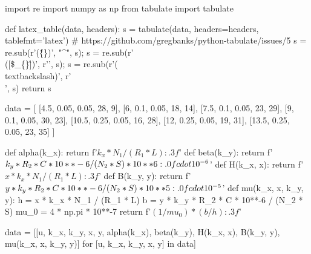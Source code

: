 \documentclass[12pt, a4paper]{article}
\begin{document}
\begin{pycode}
import re
import numpy as np
from tabulate import tabulate

def latex_table(data, headers):
  s = tabulate(data, headers=headers, tablefmt='latex')
  # https://github.com/gregbanks/python-tabulate/issues/5
  s = re.sub(r'(\^\{\})', "^", s); s = re.sub(r'\\([\$\_\{\}\^])', r'\1', s); s = re.sub(r'(\\textbackslash{})', r'\\', s)
  return s

data = [
  [4.5, 0.05, 0.05, 28, 9],
  [6, 0.1, 0.05, 18, 14],
  [7.5, 0.1, 0.05, 23, 29],
  [9, 0.1, 0.05, 30, 23],
  [10.5, 0.25, 0.05, 16, 28],
  [12, 0.25, 0.05, 19, 31],
  [13.5, 0.25, 0.05, 23, 35]
]

def alpha(k_x): return f'${k_x * N_1 / (R_1 * L):.3f}$'
def beta(k_y): return f'${k_y * R_2 * C * 10**-6 / (N_2 * S) * 10**6:.0f} \\cdot 10^{-6}$'
def H(k_x, x): return f'${x * k_x * N_1 / (R_1 * L):.3f}$'
def B(k_y, y): return f'${y * k_y * R_2 * C * 10**-6 / (N_2 * S) * 10**5:.0f} \\cdot 10^{-5}$'
def mu(k_x, x, k_y, y):
  h = x * k_x * N_1 / (R_1 * L)
  b = y * k_y * R_2 * C * 10**-6 / (N_2 * S)
  mu_0 = 4 * np.pi * 10**-7
  return f'${(1 / mu_0) * (b / h):.3f}$'

data = [[u, k_x, k_y, x, y, alpha(k_x), beta(k_y), H(k_x, x), B(k_y, y), mu(k_x, x, k_y, y)] for [u, k_x, k_y, x, y] in data]
\end{pycode}

\begin{table}[H]
\end{table} 
\end{document}
